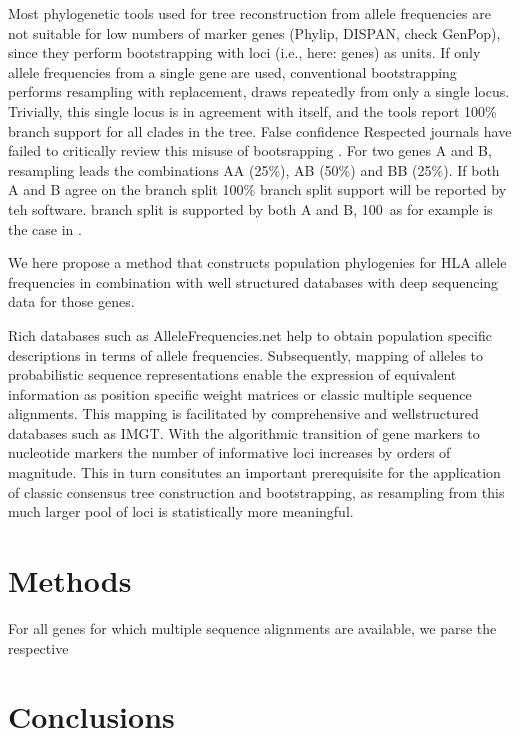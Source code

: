 Most phylogenetic tools used for tree reconstruction from allele frequencies are not suitable for low numbers of marker
genes (Phylip, DISPAN, check GenPop), since they perform bootstrapping with loci (i.e., here: genes) as units.
If only allele frequencies from a single gene are used, conventional bootstrapping performs resampling with replacement,
draws repeatedly from only a single locus. Trivially, this single locus is in agreement with itself, and the tools
report 100\% branch support for all clades in the tree.
False confidence
Respected journals have failed to critically review this misuse of bootsrapping \cite{Villena2017Jan,Hajjej2018Mar}.
For two genes A and B, resampling leads the combinations AA (25\%), AB (50\%) and BB (25\%). If both A and B agree on the branch split
100\% branch split support will be reported by teh software. branch split is
supported by both A and B, 100\
as for example is the case in \cite{Hajjej2018Mar}.


We here propose a method that constructs population phylogenies for HLA allele frequencies in combination with well structured databases
with deep sequencing data for those genes.

Rich databases such as AlleleFrequencies.net help to obtain population specific descriptions in terms of allele
frequencies. Subsequently, mapping of alleles to probabilistic sequence representations enable
the expression of equivalent information as position specific weight matrices or classic multiple sequence alignments.
 This mapping is facilitated by comprehensive and wellstructured databases such as IMGT.
With the algorithmic transition of gene markers to nucleotide markers
the number of informative loci increases by orders of magnitude.
This in turn consitutes an important prerequisite for the application of classic consensus tree construction and
bootstrapping, as resampling from this much larger pool of loci is
statistically more meaningful.




\section{Methods}

For all genes for which multiple sequence alignments are available, we parse the respective

\section{Conclusions}

